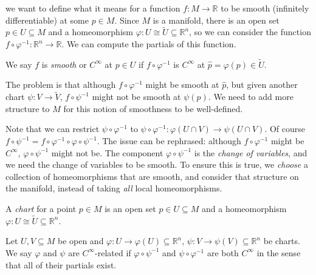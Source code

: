 
we want to define what it means for a function $f : M \to \mathbb{R} $ to be smooth (infinitely differentiable) at some $p\in M$. Since $M$ is a manifold, there is an open set $p\in U\subseteq M$ and a homeomorphism $\varphi : U \cong \widetilde{U} \subseteq \mathbb{R} ^n$, so we can consider the function $f\circ \varphi ^{-1} : \mathbb{R} ^n \to \mathbb{R} $. We can compute the partials of this function.

\begin{terminology}\label{1.1.2}
	We say $f$ is \emph{smooth} or $C^{\infty } $ at $p\in U$ if $f\circ \varphi ^{-1} $ is $C^{\infty } $ at $\hat{p} =\varphi (p)\in \widetilde{U} $.
\end{terminology}

The problem is that although $f\circ \varphi ^{-1} $ might be smooth at $\hat{p} $, but given another chart $\psi : V \to \widetilde{V} $, $f\circ \psi ^{-1} $ might not be smooth at $\psi (p)$. We need to add more structure to $M$ for this notion of smoothness to be well-defined.

Note that we can restrict $\psi \circ \varphi ^{-1} $ to $\psi \circ \varphi ^{-1} : \varphi (U \cap V) \to \psi (U \cap V)$. Of course $f\circ \psi ^{-1} =f\circ \varphi ^{-1} \circ \varphi \circ \psi ^{-1} $. The issue can be rephrased: although $f\circ \varphi ^{-1} $ might be $C^{\infty } $, $\varphi \circ \psi ^{-1} $ might not be. The component $\varphi \circ \psi ^{-1} $ is the \emph{change of variables}, and we need the change of variables to be smooth. To ensure this is true, we \emph{choose} a collection of homeomorphisms that are smooth, and consider that structure on the manifold, instead of taking \emph{all} local homeomorphisms.

\begin{definition}\label{1.1.3}
	A \emph{chart} for a point $p\in M$ is an open set $p\in U\subseteq M$ and a homeomorphism $\varphi : U \cong \widetilde{U} \subseteq \mathbb{R} ^n$.
\end{definition}
\begin{definition}\label{1.1.4}
	Let $U,V\subseteq M$ be open and $\varphi  : U \to \varphi (U)\subseteq \mathbb{R} ^n$, $\psi : V \to \psi (V)\subseteq \mathbb{R} ^n$ be charts. We say $\varphi $ and $\psi $ are $C^\infty $-related if $\varphi \circ \psi ^{-1} $ and $\psi \circ \varphi ^{-1} $ are both $C^{\infty } $ in the sense that all of their partials exist.
\end{definition}

